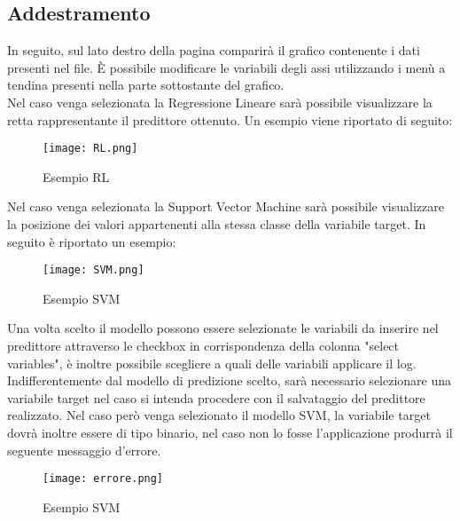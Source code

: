 \documentclass[../manuale-utente.tex]{subfiles}
\begin{document}
\newpage
\subsection{Addestramento}
\label{subs:addestramento}

In seguito, sul lato destro della pagina comparirà il grafico contenente i dati presenti nel file. È possibile modificare le variabili degli assi utilizzando i menù a tendina presenti nella parte sottostante del grafico.\\
Nel caso venga selezionata la Regressione Lineare sarà possibile visualizzare la retta rappresentante il predittore ottenuto. Un esempio viene riportato di seguito:

\begin{figure}[h!]
  \begin{center}
    \texttt{[image: RL.png]}\\
    \caption{Esempio RL}%
    \label{fig:RL}
  \end{center}
  \end{figure}


\newpage
Nel caso venga selezionata la Support Vector Machine sarà possibile visualizzare la posizione dei valori appartenenti alla stessa classe della variabile target. In seguito è riportato un esempio:

  \begin{figure}[h!]
    \begin{center}
      \texttt{[image: SVM.png]}\\
      \caption{Esempio SVM}%
      \label{fig:SVM}
    \end{center}
    \end{figure}

\newpage
Una volta scelto il modello possono essere selezionate le variabili da inserire nel predittore attraverso le checkbox in corrispondenza della colonna "select variables", è inoltre possibile scegliere a quali delle variabili applicare il log.
Indifferentemente dal modello di predizione scelto, sarà necessario selezionare una variabile target nel caso si intenda procedere con il salvataggio del predittore realizzato.
Nel caso però venga selezionato il modello SVM, la variabile target dovrà inoltre essere di tipo binario, nel caso non lo fosse l'applicazione produrrà il seguente messaggio d'errore.

\begin{figure}[h!]
  \begin{center}
    \texttt{[image: errore.png]}\\
    \caption{Esempio SVM}%
    \label{fig:SVM}
  \end{center}
  \end{figure}
\end{document}
